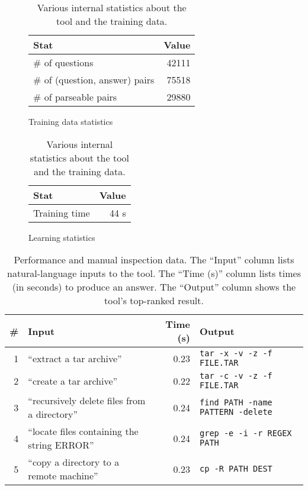 \begin{table}
    \begin{subfigure}[b]{0.48\textwidth}
        \begin{center}
        \begin{tabular}[t]{lr}
            \textbf{Stat} & \textbf{Value} \\
            \hline
            \# of questions                & 42111 \\
            \# of (question, answer) pairs & 75518 \\
            \# of parseable pairs          & 29880 \\
        \end{tabular}
        \end{center}
        \caption{Training data statistics}
    \end{subfigure}
    \begin{subfigure}[b]{0.48\textwidth}
        \begin{center}
        \begin{tabular}[t]{lr}
            \textbf{Stat} & \textbf{Value} \\
            \hline
            Training time & 44 s \\
        \end{tabular}
        \end{center}
        \caption{Learning statistics}
    \end{subfigure}
    \caption{Various internal statistics about the tool and the training data.}
    \label{tbl:stats}
\end{table}

\begin{table}
    \begin{center}
    \begin{tabular}{rlrl}
        \# & \textbf{Input} & \textbf{Time (s)} & \textbf{Output} \\
        \hline
        1  & ``extract a tar archive'' & 0.23 & \texttt{tar -x -v -z -f FILE.TAR} \\
        2  & ``create a tar archive''  & 0.22 & \texttt{tar -c -v -z -f FILE.TAR} \\
        3  & ``recursively delete files from a directory'' & 0.24 & \texttt{find PATH -name PATTERN -delete} \\
        4  & ``locate files containing the string ERROR''  & 0.24 & \texttt{grep -e -i -r REGEX PATH} \\
        5  & ``copy a directory to a remote machine'' & 0.23 & \texttt{cp -R PATH DEST} \\
    \end{tabular}
    \end{center}
    \caption{Performance and manual inspection data. The ``Input'' column lists
        natural-language inputs to the tool. The ``Time (s)'' column lists times
        (in seconds) to produce an answer. The ``Output'' column shows the
        tool's top-ranked result.}
    \label{tbl:manual-inspection}
\end{table}

